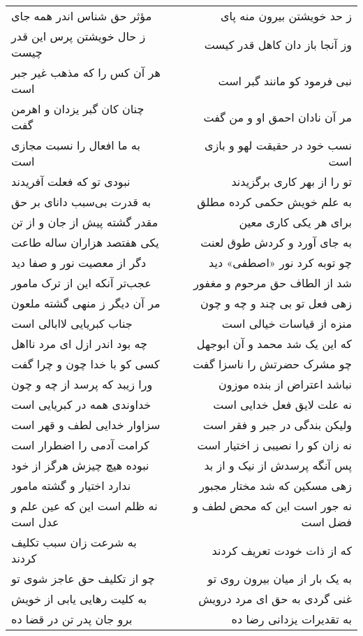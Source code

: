 \begin{center}
\begin{longtable}{l p{0.5cm} r}
مؤثر حق شناس اندر همه جای
&&
ز حد خویشتن بیرون منه پای
\\
ز حال خویشتن پرس این قدر چیست
&&
وز آنجا باز دان کاهل قدر کیست
\\
هر آن کس را که مذهب غیر جبر است
&&
نبی فرمود کو مانند گبر است
\\
چنان کان گبر یزدان و اهرمن گفت
&&
مر آن نادان احمق او و من گفت
\\
به ما افعال را نسبت مجازی است
&&
نسب خود در حقیقت لهو و بازی است
\\
نبودی تو که فعلت آفریدند
&&
تو را از بهر کاری برگزیدند
\\
به قدرت بی‌سبب دانای بر حق
&&
به علم خویش حکمی کرده مطلق
\\
مقدر گشته پیش از جان و از تن
&&
برای هر یکی کاری معین
\\
یکی هفتصد هزاران ساله طاعت
&&
به جای آورد و کردش طوق لعنت
\\
دگر از معصیت نور و صفا دید
&&
چو توبه کرد نور «اصطفی» دید
\\
عجب‌تر آنکه این از ترک مامور
&&
شد از الطاف حق مرحوم و مغفور
\\
مر آن دیگر ز منهی گشته ملعون
&&
زهی فعل تو بی چند و چه و چون
\\
جناب کبریایی لاابالی است
&&
منزه از قیاسات خیالی است
\\
چه بود اندر ازل ای مرد نااهل
&&
که این یک شد محمد و آن ابوجهل
\\
کسی کو با خدا چون و چرا گفت
&&
چو مشرک حضرتش را ناسزا گفت
\\
ورا زیبد که پرسد از چه و چون
&&
نباشد اعتراض از بنده موزون
\\
خداوندی همه در کبریایی است
&&
نه علت لایق فعل خدایی است
\\
سزاوار خدایی لطف و قهر است
&&
ولیکن بندگی در جبر و فقر است
\\
کرامت آدمی را اضطرار است
&&
نه زان کو را نصیبی ز اختیار است
\\
نبوده هیچ چیزش هرگز از خود
&&
پس آنگه پرسدش از نیک و از بد
\\
ندارد اختیار و گشته مامور
&&
زهی مسکین که شد مختار مجبور
\\
نه ظلم است این که عین علم و عدل است
&&
نه جور است این که محض لطف و فضل است
\\
به شرعت زان سبب تکلیف کردند
&&
که از ذات خودت تعریف کردند
\\
چو از تکلیف حق عاجز شوی تو
&&
به یک بار از میان بیرون روی تو
\\
به کلیت رهایی یابی از خویش
&&
غنی گردی به حق ای مرد درویش
\\
برو جان پدر تن در قضا ده
&&
به تقدیرات یزدانی رضا ده
\\
\end{longtable}
\end{center}

